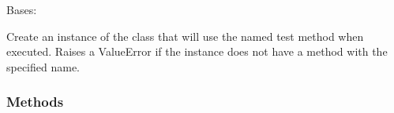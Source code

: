 \documentclass[letterpaper,10pt,english]{sphinxmanual}
\begin{document}
\begin{fulllineitems}
\label{\detokenize{_autosummary/tests.test_unit.test_df:tests.test_unit.test_df}}
\pysigstartsignatures
{}
\pysigstopsignatures
\sphinxAtStartPar
Bases: 

\begin{fulllineitems}
\label{\detokenize{_autosummary/tests.test_unit.test_df:tests.test_unit.test_df.__init__}}
\pysigstartsignatures
{}
\pysigstopsignatures
\sphinxAtStartPar
Create an instance of the class that will use the named test
method when executed. Raises a ValueError if the instance does
not have a method with the specified name.

\end{fulllineitems}

\subsubsection*{Methods}


\begin{savenotes}
\sphinxatlongtablestart
\sphinxthistablewithglobalstyle
\sphinxthistablewithnovlinesstyle
\begin{longtable}[c]{}
\sphinxtoprule
\endfirsthead

\\
\sphinxtoprule
\endhead

\sphinxbottomrule
{}\\
\endfoot

\endlastfoot
\sphinxtableatstartofbodyhook


\end{longtable}
\end{savenotes}
\end{fulllineitems}
\end{document}
